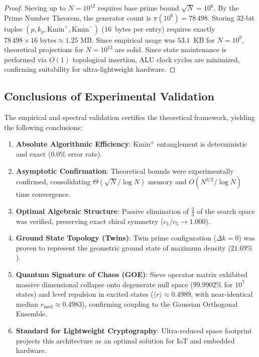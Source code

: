 \documentclass{article}
\numberwithin{equation}{section}
\theoremstyle{plain}
\theoremstyle{definition}
\begin{document}
\begin{proof}
Sieving up to $N = 10^{12}$ requires base prime bound $\sqrt{N} = 10^6$. By the Prime Number Theorem, the generator count is $\pi(10^6) = 78\,498$. Storing $32$-bit tuples $(p, k_p, \mathrm{Kmin}^+, \mathrm{Kmin}^-)$ ($16$~bytes per entry) requires exactly $78\,498 \times 16 \text{ bytes} \approx 1.25 \text{ MB}$. Since empirical usage was $53.1$~KB for $N=10^9$, theoretical projections for $N=10^{12}$ are solid. Since state maintenance is performed via $O(1)$ topological insertion, ALU clock cycles are minimized, confirming suitability for ultra-lightweight hardware.
\end{proof}

\subsection{Conclusions of Experimental Validation}

The empirical and spectral validation certifies the theoretical framework, yielding the following conclusions:

\begin{enumerate}
    \item \textbf{Absolute Algorithmic Efficiency}: $\mathrm{Kmin}^\pm$ entanglement is deterministic and exact ($0.0\%$ error rate).
    \item \textbf{Asymptotic Confirmation}: Theoretical bounds were experimentally confirmed, consolidating $\Theta(\sqrt{N}/\log N)$ memory and $O(N^{3/2}/\log N)$ time convergence.
    \item \textbf{Optimal Algebraic Structure}: Passive elimination of $\frac{2}{3}$ of the search space was verified, preserving exact chiral symmetry ($c_1/c_5 \to 1.000$).
    \item \textbf{Ground State Topology (Twins)}: Twin prime configuration ($\Delta k = 0$) was proven to represent the geometric ground state of maximum density ($21.69\%$).
    \item \textbf{Quantum Signature of Chaos (GOE)}: Sieve operator matrix exhibited massive dimensional collapse onto degenerate null space ($99.9902\%$ for $10^7$ states) and level repulsion in excited states ($\langle r \rangle \approx 0.4989$, with near-identical median $r_{\text{med}} \approx 0.4983$), confirming coupling to the Gaussian Orthogonal Ensemble.
    \item \textbf{Standard for Lightweight Cryptography}: Ultra-reduced space footprint projects this architecture as an optimal solution for IoT and embedded hardware.
\end{enumerate}
\end{document}

